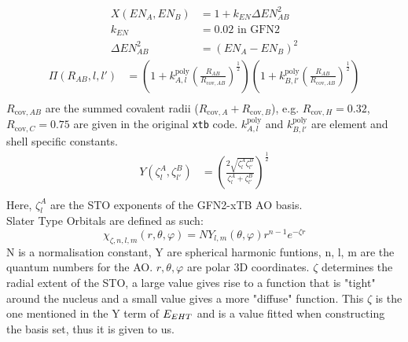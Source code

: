 \begin{align}
    X(EN_A,EN_B) &= 1 + k_{EN}\Delta EN_{AB}^2\\
    k_{EN} &= 0.02 \text{ in GFN2}\\
    \Delta EN_{AB}^2 &= (EN_A-EN_B)^2  
\end{align}
\begin{equation}
\begin{split}
    \Pi(R_{AB},l,l') &= \left(1 + k^{\text{poly}}_{A,l}\left(\frac{R_{AB}}{R_{\text{cov},AB}}\right)^\frac{1}{2}\right)\left(1 + k^{\text{poly}}_{B,l'}\left(\frac{R_{AB}}{R_{\text{cov},AB}}\right)^\frac{1}{2}\right)\\
\end{split}
\end{equation}
$R_{\text{cov},AB}$ are the summed covalent radii (\(R_{\text{cov},A} + R_{\text{cov},B}\)), e.g. $R_{\text{cov},H}=0.32$, $R_{\text{cov},C}=0.75$ are given in the original \texttt{xtb} code. $k^{\text{poly}}_{A,l}$ and $k^{\text{poly}}_{B,l'}$ are element and shell specific constants. 
\begin{equation}
\begin{split}
    Y(\zeta^A_l,\zeta^B_{l'}) &= \left(\frac{2\sqrt{\zeta^A_l\zeta^B_{l'}}}{\zeta^A_l+\zeta^B_{l'}}\right)^\frac{1}{2}\\
\end{split}
\end{equation}
Here, $\zeta^A_l$ are the STO exponents of the GFN2-xTB AO basis.\\
Slater Type Orbitals are defined as such: 
\begin{equation}
\chi_{\zeta,n,l,m}(r, \theta, \varphi) = NY_{l,m}(\theta, \varphi)r^{n-1}e^{-\zeta r}
\end{equation}
N is a normalisation constant, Y are spherical harmonic funtions, n, l, m are the quantum numbers for the AO. $r,\theta,\varphi$ are polar 3D coordinates. $\zeta$ determines the radial extent of the STO, a large value gives rise to a function that is "tight" around the nucleus and a small value gives a more "diffuse" function. This $\zeta$ is the one mentioned in the Y term of $\E{EHT}$ and is a value fitted when constructing the basis set, thus it is given to us.  

